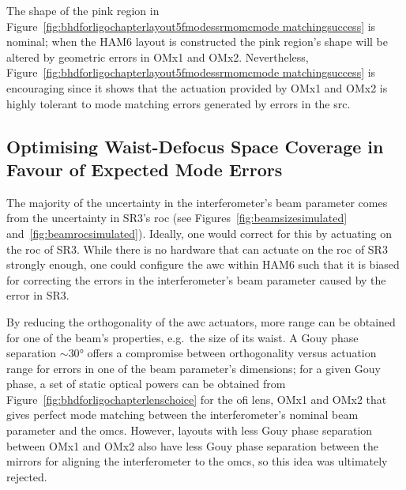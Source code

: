 \par
The shape of the pink region in Figure~\ref{fig:bhdforligochapterlayout5fmodessrmomcmode matchingsuccess} is nominal; when the HAM6 layout is constructed the pink region's shape will be altered by geometric errors in OMx1 and OMx2. Nevertheless, Figure~\ref{fig:bhdforligochapterlayout5fmodessrmomcmode matchingsuccess} is encouraging since it shows that the actuation provided by OMx1 and OMx2 is highly tolerant to mode matching errors generated by errors in the \gls{src}.
\subsection{Optimising Waist-Defocus Space Coverage in Favour of Expected Mode Errors}
\label{sec:BHDforligochapter_super_actuator}
The majority of the uncertainty in the interferometer's beam parameter comes from the uncertainty in SR3's \gls{roc} (see Figures~\ref{fig:beamsizesimulated} and~\ref{fig:beamrocsimulated}). Ideally, one would correct for this by actuating on the \gls{roc} of SR3. While there is no hardware that can actuate on the \gls{roc} of SR3 strongly enough, one could configure the \gls{awc} within HAM6 such that it is biased for correcting the errors in the interferometer's beam parameter caused by the error in SR3. 
\par
By reducing the orthogonality of the \gls{awc} actuators, more range can be obtained for one of the beam's properties, e.g.~the size of its waist. A Gouy phase separation $\sim\!\ang{30}$ offers a compromise between orthogonality versus actuation range for errors in one of the beam parameter's dimensions; for a given Gouy phase, a set of static optical powers can be obtained from Figure~\ref{fig:bhdforligochapterlenschoice} for the \gls{ofi} lens, OMx1 and OMx2 that gives perfect mode matching between the interferometer's nominal beam parameter and the \glspl{omc}. However, layouts with less Gouy phase separation between OMx1 and OMx2 also have less Gouy phase separation between the mirrors for aligning the interferometer to the \glspl{omc}, so this idea was ultimately rejected.


